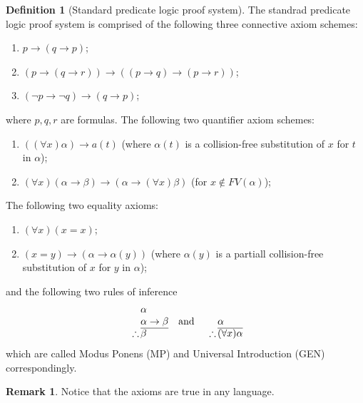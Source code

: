\documentclass[11pt,a4paper]{article}
\theoremstyle{definition}
\newtheorem{definition}{Definition}[section]
\newtheorem{remark}{Remark}[section]
\theoremstyle{plain}
\newcommand{\tand}{\quad \text{and} \quad}
\renewcommand{\implies}{\rightarrow}
\begin{document}
  \begin{definition}[Standard predicate logic proof system]
    The standrad predicate logic proof system is comprised of the
    following three connective axiom schemes:
    \begin{enumerate}
      \item[(1)] $p\to (q\to p)$;
      \item[(2)] $(p\to (q\to r))\to ((p\to q)\to (p\to r))$;
      \item[(3)] $(\neg p\to \neg q)\to (q\to p)$;
    \end{enumerate}
    where $p,q,r$ are formulas.
    The following two quantifier axiom schemes:
    \begin{enumerate}
      \item[(4)] $((\forall x) \alpha) \implies a(t)$ (where $\alpha(t)$
        is a collision-free substitution of $x$ for $t$ in $\alpha$);
      \item[(5)] $(\forall x)(\alpha \implies \beta) \implies
        (\alpha \implies (\forall x)\beta)$ (for $x \notin FV(\alpha)$);
    \end{enumerate}
    The following two equality axioms:
    \begin{enumerate}
      \item[(6)] $(\forall x)(x = x)$;
      \item[(7)] $(x = y) \implies (\alpha \implies \alpha(y))$ (where
        $\alpha(y)$ is a partiall collision-free substitution of $x$
        for $y$ in $\alpha$);
    \end{enumerate}
    and the following two rules of inference
    \[
      \begin{array}{c@{\,}l@{}}
                  & \alpha         \\
                  & \alpha \to \beta   \\ \cline{2-2}
      \therefore  & \beta
      \end{array} \tand
      \begin{array}{c@{\,}l@{}}
                  & \\
                  & \alpha         \\ \cline{2-2}
      \therefore  & (\forall x)\alpha
      \end{array}
    \]
    which are called Modus Ponens (MP) and Universal Introduction (GEN)
    correspondingly.
  \end{definition}

  \begin{remark}
    Notice that the axioms are true in any language.
  \end{remark}
\end{document}
